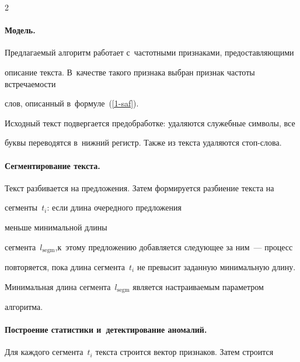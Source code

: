 \begin{multicols}{2}



\paragraph*{Модель.}

Предлагаемый алгоритм работает с~час\-тот\-ны\-ми признаками, предоставляющими 

описание текста. В~качестве такого признака выбран признак частоты встречаемости 

слов, описанный в~формуле~(\ref{1-saf}).



Исходный текст подвергается предобработке: удаляются служебные символы, все 

буквы переводятся в~нижний регистр. Также  из текста удаляются стоп-слова.



\vspace*{-8pt}



\paragraph*{Сегментирование текста.}

Текст разбивается на предложения. Затем формируется разбиение текста на 

сегменты~$t_i$: если длина очередного предложения

 меньше минимальной длины 

сегмента~$l_{\mathrm{segm}}$,\linebreak к~этому предложению добавляется следующее за ним~--- процесс 

повторяется, пока длина сегмента~$t_i$ не превысит заданную минимальную длину. 

Минимальная длина сегмента~$l_{\mathrm{segm}}$ является настраиваемым параметром 

алгоритма.



\vspace*{-8pt}



\paragraph*{Построение статистики и~детектирование аномалий.}

Для каждого сегмента~$t_i$ текста строится  вектор признаков. Затем строится 


\end{multicols}
